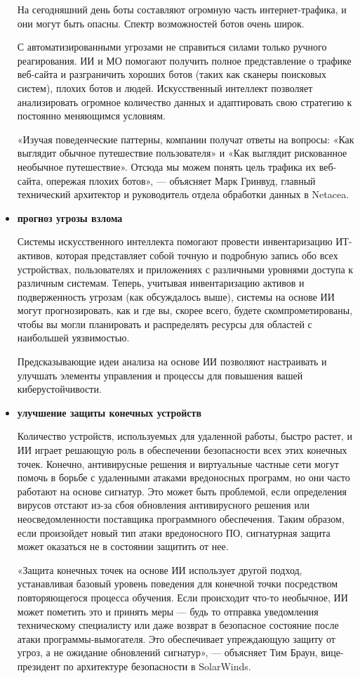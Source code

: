 \documentclass{article}
\begin{document}
\begin{itemize}
		На сегодняшний день боты составляют огромную часть интернет-трафика, и они могут быть опасны. Спектр возможностей ботов очень широк.
  \par
		С автоматизированными угрозами не справиться силами только ручного реагирования. ИИ и МО помогают получить полное представление о трафике веб-сайта и разграничить хороших ботов (таких как сканеры поисковых систем), плохих ботов и людей. Искусственный интеллект позволяет анализировать огромное количество данных и  адаптировать свою стратегию к постоянно меняющимся условиям.
  \par
		«Изучая поведенческие паттерны, компании получат ответы на вопросы: «Как выглядит обычное путешествие пользователя» и «Как выглядит рискованное необычное путешествие». Отсюда мы можем понять цель трафика их веб-сайта, опережая плохих ботов», — объясняет Марк Гринвуд, главный технический архитектор и руководитель отдела обработки данных в Netacea.
		\item \textbf{прогноз угрозы взлома}
		
		Системы искусственного интеллекта помогают провести инвентаризацию ИТ-активов, которая представляет собой точную и подробную запись обо всех устройствах, пользователях и приложениях с различными уровнями доступа к различным системам. Теперь, учитывая инвентаризацию активов и подверженность угрозам (как обсуждалось выше), системы на основе ИИ могут прогнозировать, как и где вы, скорее всего, будете скомпрометированы, чтобы вы могли планировать и распределять ресурсы для областей с наибольшей уязвимостью.
  \par
		Предсказывающие идеи анализа на основе ИИ позволяют настраивать и улучшать элементы управления и процессы для повышения вашей киберустойчивости.
		\item \textbf{улучшение защиты конечных устройств}
		
		Количество устройств, используемых для удаленной работы, быстро растет, и ИИ играет решающую роль в обеспечении безопасности всех этих конечных точек.
		Конечно, антивирусные решения и виртуальные частные сети могут помочь в борьбе с удаленными атаками вредоносных программ, но они часто работают на основе сигнатур. Это может быть проблемой, если определения вирусов отстают из-за сбоя обновления антивирусного решения или неосведомленности поставщика программного обеспечения. Таким образом, если произойдет новый тип атаки вредоносного ПО, сигнатурная защита может оказаться не в состоянии защитить от нее.
  \par
		«Защита конечных точек на основе ИИ использует другой подход, устанавливая базовый уровень поведения для конечной точки посредством повторяющегося процесса обучения. Если происходит что-то необычное, ИИ может пометить это и принять меры — будь то отправка уведомления техническому специалисту или даже возврат в безопасное состояние после атаки программы-вымогателя. Это обеспечивает упреждающую защиту от угроз, а не ожидание обновлений сигнатур», — объясняет Тим ​​Браун, вице-президент по архитектуре безопасности в SolarWinds.
	\end{itemize}
	
\end{document}
